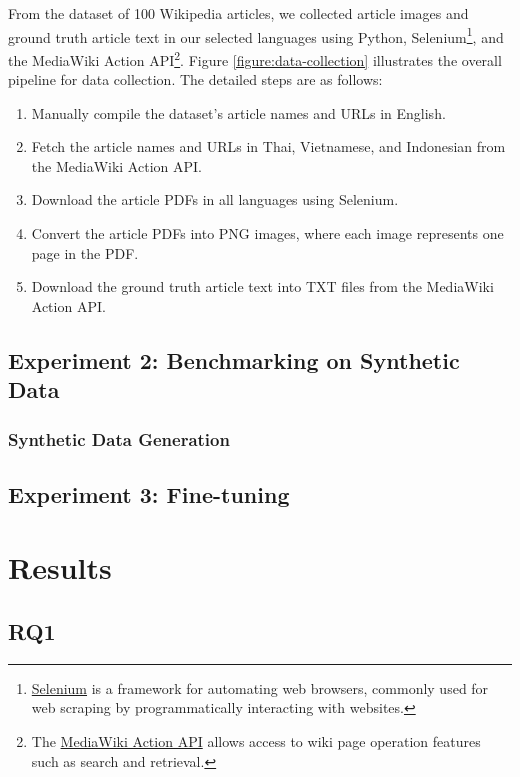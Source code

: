 \documentclass[12pt,oneside]{memoir}
\begin{document}
From the dataset of 100 Wikipedia articles, we collected article images and ground 
truth article text in our selected languages using Python, 
Selenium\footnote{\href{https://selenium-python.readthedocs.io}{Selenium} is a 
framework for automating web browsers, commonly used for web scraping by programmatically 
interacting with websites.}, and the MediaWiki Action API\footnote{The \href{https://www.mediawiki.org/wiki/API:Main_page}{MediaWiki Action API} allows 
access to wiki page operation features such as search and retrieval.}. Figure \ref{figure:data-collection} illustrates the overall pipeline 
for data collection. The detailed steps are as follows:

\begin{enumerate}
    \item Manually compile the dataset’s article names and URLs in English.
    \item Fetch the article names and URLs in Thai, Vietnamese, and Indonesian from the MediaWiki Action API.
    \item Download the article PDFs in all languages using Selenium.
    \item Convert the article PDFs into PNG images, where each image represents one page in the PDF.
    \item Download the ground truth article text into TXT files from the MediaWiki Action API.
\end{enumerate}

\section{Experiment 2: Benchmarking on Synthetic Data}

\subsection{Synthetic Data Generation}

\section{Experiment 3: Fine-tuning}

\chapter{Results}

\section{RQ1}
\end{document}
